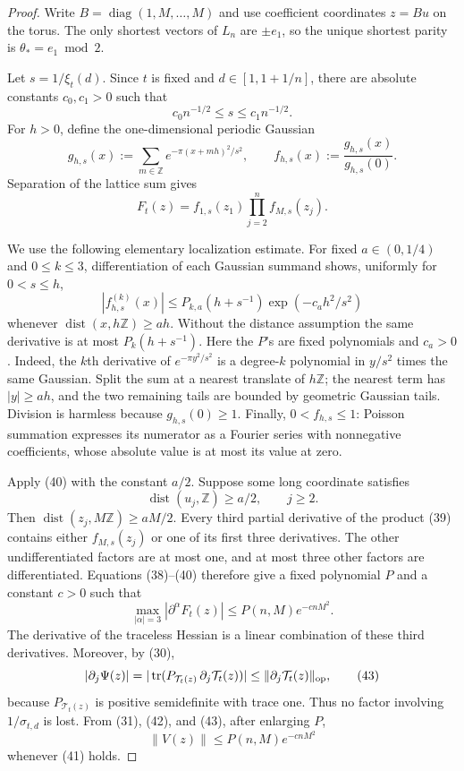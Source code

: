 \documentclass[10pt]{article}
\theoremstyle{definition}
\newcommand{\Z}{\mathbb{Z}}
\newcommand{\tr}{\mathop{\rm tr}}
\newcommand{\op}{\mathrm{op}}
\newcommand{\norm}[1]{\lVert #1\rVert}
\newcommand{\cT}{\mathcal{T}}
\begin{document}
\begin{proof}
Write $B=\operatorname{diag}(1,M,\ldots,M)$ and use coefficient coordinates
$z=Bu$ on the torus.  The only shortest vectors of $L_n$ are
$\pm e_1$, so the unique shortest parity is
$\theta_*=e_1\bmod2$.

Let $s=1/\xi_t(d)$.  Since $t$ is fixed and $d\in[1,1+1/n]$, there are
absolute constants $c_0,c_1>0$ such that
\[
 c_0n^{-1/2}\le s\le c_1n^{-1/2}.                               \tag{38}
\]
For $h>0$, define the one-dimensional periodic Gaussian
\[
 g_{h,s}(x):=\sum_{m\in\Z}e^{-\pi(x+mh)^2/s^2},
 \qquad f_{h,s}(x):=\frac{g_{h,s}(x)}{g_{h,s}(0)}.
\]
Separation of the lattice sum gives
\[
 F_t(z)=f_{1,s}(z_1)\prod_{j=2}^n f_{M,s}(z_j).                  \tag{39}
\]

We use the following elementary localization estimate.  For fixed
$a\in(0,1/4)$ and $0\le k\le3$, differentiation of each Gaussian summand
shows, uniformly for $0<s\le h$,
\[
 \left|f_{h,s}^{(k)}(x)\right|
 \le P_{k,a}(h+s^{-1})
 \exp\!\left(-c_a h^2/s^2\right)                                \tag{40}
\]
whenever $\operatorname{dist}(x,h\Z)\ge ah$.  Without the distance
assumption the same derivative is at most $P_k(h+s^{-1})$.  Here the $P$'s
are fixed polynomials and $c_a>0$.  Indeed, the $k$th derivative of
$e^{-\pi y^2/s^2}$ is a degree-$k$ polynomial in $y/s^2$ times the same
Gaussian.  Split the sum at a nearest translate of $h\Z$; the nearest term
has $|y|\ge ah$, and the two remaining tails are bounded by geometric
Gaussian tails.  Division is harmless because $g_{h,s}(0)\ge1$.  Finally,
$0<f_{h,s}\le1$: Poisson summation expresses its numerator as a Fourier
series with nonnegative coefficients, whose absolute value is at most its
value at zero.

Apply (40) with the constant $a/2$.  Suppose some long coordinate satisfies
\[
 \operatorname{dist}(u_j,\Z)\ge a/2,
 \qquad j\ge2.                                                   \tag{41}
\]
Then $\operatorname{dist}(z_j,M\Z)\ge aM/2$.  Every third partial derivative
of the product (39) contains either $f_{M,s}(z_j)$ or one of its first three
derivatives.  The other undifferentiated factors are at most one, and at most
three other factors are differentiated.  Equations (38)--(40) therefore
give a fixed polynomial $P$ and a constant $c>0$ such that
\[
 \max_{|\alpha|=3}|\partial^\alpha F_t(z)|
 \le P(n,M)e^{-cnM^2}.                                          \tag{42}
\]
The derivative of the traceless Hessian is a linear combination of these
third derivatives.  Moreover, by (30),
\[
 |\partial_j\Psi(z)|
 =|\tr(P_{\cT_t(z)}\,\partial_j\cT_t(z))|
 \le\norm{\partial_j\cT_t(z)}_{\op},                            \tag{43}
\]
because $P_{\cT_t(z)}$ is positive semidefinite with trace one.  Thus no
factor involving $1/\sigma_{t,d}$ is lost.  From (31), (42), and (43), after
enlarging $P$,
\[
 \norm{V(z)}\le P(n,M)e^{-cnM^2}                                \tag{44}
\]
whenever (41) holds.


\end{proof}
\end{document}

